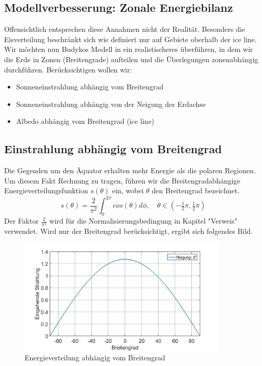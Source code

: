 \begin{refsection}
\section{Modellverbesserung: Zonale Energiebilanz}
Offensichtlich entsprechen diese Annahmen nicht der Realität. Besonders die Eisverteilung beschränkt sich wie definiert nur auf Gebiete oberhalb der ice line.
Wir möchten nun Budykos Modell in ein realistischeres überführen, in dem wir die Erde in Zonen (Breitengrade) aufteilen und die Überlegungen zonenabhängig durchführen. Berücksichtigen wollen wir:
\begin{itemize}
\item Sonneneinstrahlung abhängig vom Breitengrad
\item Sonneneinstrahlung abhängig von der Neigung der Erdachse
\item Albedo abhängig vom Breitengrad (ice line)
\end{itemize}
\subsection{Einstrahlung abhängig vom Breitengrad}
Die Gegenden um den Äquator erhalten mehr Energie als die polaren Regionen. Um diesem Fakt Rechnung zu tragen, führen wir die Breitengradabhängige Energieverteilungsfunktion $s(\theta)$ ein, wobei $\theta$ den Breitengrad bezeichnet.
\begin{equation}\label{Energieverteilung Breitengrad}
s(\theta)
=
\frac{2}{\pi^2}\int_{0}^{2\pi}cos(\theta)d\phi,\quad
\theta\in(-\tfrac{1}{2}\pi,\tfrac{1}{2}\pi)
\end{equation}
Der Faktor $\frac{2}{\pi^2}$ wird für die Normalisierungsbedingung in Kapitel "Verweis" verwendet. Wird nur der Breitengrad berücksichtigt, ergibt sich folgendes Bild.
\begin{figure}[H]
 	\centering
 	\includegraphics[width=10cm]{eis/Einstrahlung_abh_vom_Breitengrad.jpg}
 	\caption{Energieverteilung abhängig vom Breitengrad}
\end{figure}

\end{refsection}
